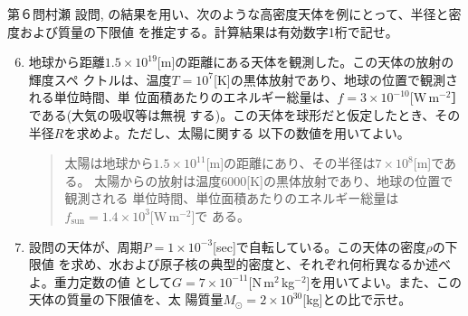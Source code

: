 \begin{question}{第６問}{村瀬}
設問, の結果を用い、次のような高密度天体を例にとって、半径と密度および質量の下限値
を推定する。計算結果は有効数字1桁で記せ。
\begin{enumerate}
\setcounter{enumi}{5}
\item{}
  地球から距離$1.5\times10^{19}$[m]の距離にある天体を観測した。この天体の放射の輝度スペ
  クトルは、温度$T=10^7$[K]の黒体放射であり、地球の位置で観測される単位時間、単
  位面積あたりのエネルギー総量は、$f=3\times10^{-10}$[W\,m$^{-2}$］である(大気の吸収等は無視
  する)。この天体を球形だと仮定したとき、その半径$R$を求めよ。ただし、太陽に関する
  以下の数値を用いてよい。
  \begin{quote}
    太陽は地球から$1.5\times10^{11}$[m]の距離にあり、その半径は$7\times10^8$[m]である。
    太陽からの放射は温度6000[K]の黒体放射であり、地球の位置で観測される
    単位時間、単位面積あたりのエネルギー総量は$f_\mathrm{sun}=1.4\times10^3$[W\,m$^{-2}$]で
    ある。
  \end{quote}
\item
  設問の天体が、周期$P=1\times10^{-3}$[sec]で自転している。この天体の密度$\rho$の下限値
  を求め、水および原子核の典型的密度と、それぞれ何桁異なるか述べよ。重力定数の値
  として$G=7\times10^{-11}$[N\,m$^2$\,kg$^{-2}$]を用いてよい。また、この天体の質量の下限値を、太
  陽質量$M_\odot=2\times10^{30}$[kg]との比で示せ。
\end{enumerate}
\end{question}

